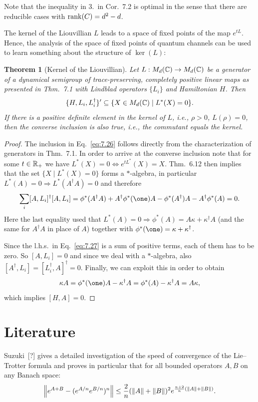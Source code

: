 \documentclass[11pt,a4paper]{article}
\theoremstyle{plain}
\newtheorem{theorem}{Theorem}
\begin{document}
Note that the inequality in 3.\ in Cor.~7.2 is optimal in the sense that there are reducible cases with $\operatorname{rank}(C)=d^2-d$.

The kernel of the Liouvillian $L$ leads to a space of fixed points of the map $e^{tL}$. Hence, the analysis of the space of fixed points of quantum channels can be used to learn something about the structure of $\ker(L)$:

\begin{theorem}[Kernel of the Liouvillian]
    Let $L:M_d(\mathbb{C})\to M_d(\mathbb{C})$ be a generator of a dynamical semigroup of trace-preserving, completely positive linear maps as presented in Thm.~7.1 with Lindblad operators $\{L_i\}$ and Hamiltonian $H$. Then
    \begin{equation}\label{eq:7.26}
        \{H,L_i,L_i^{\dagger}\}' \subseteq \{X\in M_d(\mathbb{C})\mid L^{*}(X)=0\}.
    \end{equation}
    If there is a positive definite element in the kernel of $L$, i.e., $\rho>0$, $L(\rho)=0$, then the converse inclusion is also true, i.e., the commutant equals the kernel.
\end{theorem}

\begin{proof}
    The inclusion in Eq.~\eqref{eq:7.26} follows directly from the characterization of generators in Thm.~7.1. In order to arrive at the converse inclusion note that for some $t\in\mathbb{R}_{+}$ we have $L^{*}(X)=0 \Leftrightarrow e^{tL^{*}}(X)=X$. Thm.~6.12 then implies that the set $\{X\mid L^{*}(X)=0\}$ forms a $\ast$-algebra, in particular $L^{*}(A)=0\Rightarrow L^{*}(A^{\dagger}A)=0$ and therefore
    \begin{equation}\label{eq:7.27}
        \sum_i [A,L_i]^{\dagger}[A,L_i]
        = \phi^{*}(A^{\dagger}A) + A^{\dagger}\phi^{*}(\one)A - \phi^{*}(A^{\dagger})A - A^{\dagger}\phi^{*}(A)
        = 0.
    \end{equation}
    Here the last equality used that $L^{*}(A)=0\Rightarrow \phi^{*}(A)=A\kappa+\kappa^{\dagger}A$ (and the same for $A^{\dagger}A$ in place of $A$) together with $\phi^{*}(\one)=\kappa+\kappa^{\dagger}$.

    Since the l.h.s.\ in Eq.~\eqref{eq:7.27} is a sum of positive terms, each of them has to be zero. So $[A,L_i]=0$ and since we deal with a $\ast$-algebra, also $[A^{\dagger},L_i]=[L_i^{\dagger},A]^{\dagger}=0$. Finally, we can exploit this in order to obtain
    \[
        \kappa A = \phi^{*}(\one)A - \kappa^{\dagger}A = \phi^{*}(A) - \kappa^{\dagger}A = A\kappa,
    \]
    which implies $[H,A]=0$.
\end{proof}

\section{Literature}

Suzuki~[?] gives a detailed investigation of the speed of convergence of the Lie--Trotter formula and proves in particular that for all bounded operators $A,B$ on any Banach space:
\begin{equation}\label{eq:7.28}
    \Bigl\lVert e^{A+B} - (e^{A/n}e^{B/n})^n \Bigr\rVert
    \le \frac{2}{n}(\lVert A\rVert+\lVert B\rVert)^2
    e^{\frac{n+2}{n}(\lVert A\rVert+\lVert B\rVert)}.
\end{equation}
\end{document}
